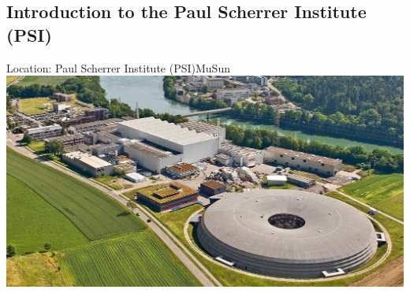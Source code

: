 \documentclass{beamer}
\begin{document}
\subsection{Introduction to the Paul Scherrer Institute (PSI)}

\begin{frame}{Location: Paul Scherrer Institute (PSI)}{MuSun}
 \includegraphics[width=\textwidth]{figures/psi.jpg}
 \let\thefootnote\relax{}
\end{frame}
\end{document}
